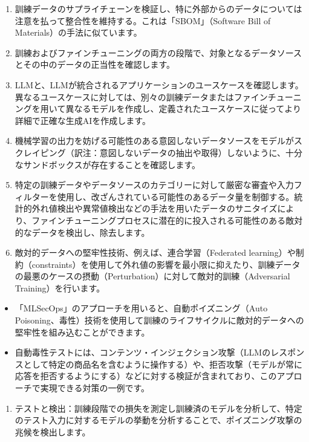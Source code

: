 \documentclass[
]{article}
\providecommand{\tightlist}{%
  \setlength{\itemsep}{0pt}\setlength{\parskip}{0pt}}
\begin{document}
\begin{enumerate}
\def\labelenumi{\arabic{enumi}.}
\item
  訓練データのサプライチェーンを検証し、特に外部からのデータについては注意を払って整合性を維持する。これは「SBOM」（Software
  Bill of Materials）の手法に似ています。
\item
  訓練およびファインチューニングの両方の段階で、対象となるデータソースとその中のデータの正当性を確認します。
\item
  LLMと、LLMが統合されるアプリケーションのユースケースを確認します。異なるユースケースに対しては、別々の訓練データまたはファインチューニングを用いて異なるモデルを作成し、定義されたユースケースに従ってより詳細で正確な生成AIを作成します。
\item
  機械学習の出力を妨げる可能性のある意図しないデータソースをモデルがスクレイピング（訳注：意図しないデータの抽出や取得）しないように、十分なサンドボックスが存在することを確認します。
\item
  特定の訓練データやデータソースのカテゴリーに対して厳密な審査や入力フィルターを使用し、改ざんされている可能性のあるデータ量を制御する。統計的外れ値検出や異常値検出などの手法を用いたデータのサニタイズにより、ファインチューニングプロセスに潜在的に投入される可能性のある敵対的なデータを検出し、除去します。
\item
  敵対的データへの堅牢性技術、例えば、連合学習（Federated
  learning）や制約（constraints）を使用して外れ値の影響を最小限に抑えたり、訓練データの最悪のケースの摂動（Perturbation）に対して敵対的訓練（Adversarial
  Training）を行います。
\end{enumerate}

\begin{itemize}
\tightlist
\item
  「MLSecOps」のアプローチを用いると、自動ポイズニング（Auto
  Poisoning、毒性）技術を使用して訓練のライフサイクルに敵対的データへの堅牢性を組み込むことができます。
\item
  自動毒性テストには、コンテンツ・インジェクション攻撃（LLMのレスポンスとして特定の商品名を含むように操作する）や、拒否攻撃（モデルが常に応答を拒否するようにする）などに対する検証が含まれており、このアプローチで実現できる対策の一例です。
\end{itemize}

\begin{enumerate}
\def\labelenumi{\arabic{enumi}.}
\tightlist
\item
  テストと検出：訓練段階での損失を測定し訓練済のモデルを分析して、特定のテスト入力に対するモデルの挙動を分析することで、ポイズニング攻撃の兆候を検出します。
\end{enumerate}
\end{document}
